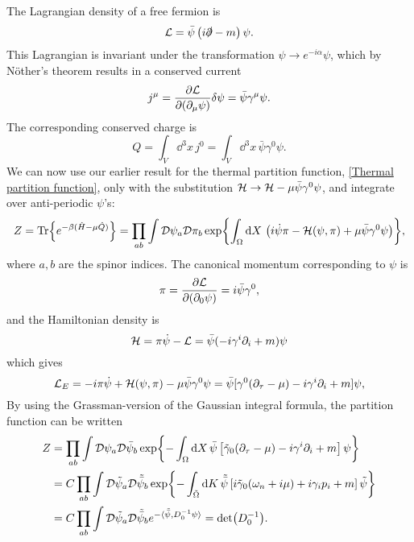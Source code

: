 The Lagrangian density of a free fermion is
\begin{equation}
    \mathcal{L} = \bar \psi \left( i \slashed{\partial} - m \right) \psi.
\end{equation}
This Lagrangian is invariant under the transformation $\psi \rightarrow e^{-i \alpha} \psi$, which by Nöther's theorem results in a conserved current
\begin{equation}
    j^\mu = \pdv{\mathcal{L}}{(\partial_\mu \psi)} \delta \psi=  \bar \psi \gamma^\mu \psi.
\end{equation}
The corresponding conserved charge is 
\begin{equation}
    Q = \int_V \dd^3 x\, j^0 = \int_V \dd^3 x \, \bar \psi \gamma^0 \psi.
\end{equation}
We can now use our earlier result for the thermal partition function, \autoref{Thermal partition function}, only with the substitution $\mathcal{H} \rightarrow \mathcal{H} - \mu \bar \psi \gamma^0 \psi$, and integrate over anti-periodic $\psi$'s:
\begin{equation*}
    Z = \Tr{e^{-\beta(\hat H - \mu \hat Q)}}
    = \prod_{a b}\int \mathcal{D} \psi_a\mathcal{D} \pi_b \exp{
        \int_{\Omega} \dd X \, 
        \left(
            i\dot \psi \pi - \mathcal{H}(\psi, \pi) + \mu \bar \psi \gamma^0 \psi
        \right)
    },
\end{equation*}
where $a, b$ are the spinor indices.
The canonical momentum corresponding to $\psi$ is
\begin{equation}
    \pi = \pdv{\mathcal{L}}{(\partial_0 \psi)} = i \bar \psi \gamma^0,
\end{equation}
and the Hamiltonian density is 
\begin{equation}
    \mathcal{H} = \pi \dot\psi - \mathcal{L}
    = \bar \psi (-i\gamma^i\partial_i + m) \psi
\end{equation}
which gives
\begin{equation}
    \mathcal{L}_E = 
    - i \pi \dot\psi + \mathcal{H}(\psi, \pi) - \mu \bar \psi \gamma^0 \psi
    = \bar\psi[\gamma^0 (\partial_\tau - \mu) - i\gamma^i \partial_i + m] \psi,
\end{equation}
By using the Grassman-version of the Gaussian integral formula, the partition function can be written
\begin{align*}
    Z & = \prod_{a b}\int \mathcal{D} \psi_a\mathcal{D} \bar \psi_b 
    \exp{
        - \int_\Omega \dd X \, \bar \psi
        \left[
            \tilde\gamma_0(\partial_\tau -\mu) -  i \gamma^i \partial_i + m
        \right]
        \psi
    }\\
    & = C \prod_{a b}\int \mathcal{D} \tilde \psi_a\mathcal{D} \tilde {\bar \psi}_b 
    \exp{
        - \int_{\tilde \Omega} \dd K \, \tilde {\bar \psi}
        \left[
            i \tilde\gamma_0(\omega_n + i\mu) + i \gamma_i p_i + m
        \right]
        \tilde \psi
    } \\
    & = C \prod_{a b}\int \mathcal{D} \tilde \psi_a\mathcal{D} \tilde {\bar \psi}_b 
    e^{- \langle \tilde {\bar \psi}, D_0^{-1} \psi\rangle} 
    = \det(D_0^{-1}).
\end{align*}
